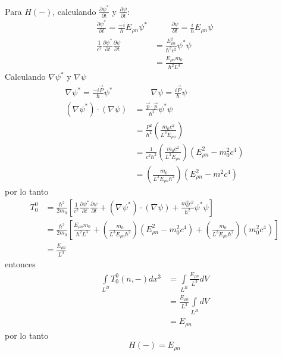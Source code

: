 Para $H(-)$, calculando $ \frac{\partial \psi^*}{\partial t}$  y $ \frac{\partial \psi}{\partial t}$:
\begin{align*}
    \frac{\partial \psi^*}{\partial t} = \frac{-i}{\hbar} E_{\rho n} \psi^* &\qquad  \frac{\partial \psi}{\partial t} = \frac{i}{\hbar} E_{\rho n} \psi\\
    \frac{1}{c^2}  \frac{\partial \psi^*}{\partial t} \frac{\partial \psi}{\partial t} &= \frac{E_{\rho n}^2}{\hbar^2c^2} \psi^* \psi\\
    &= \frac{E_{\rho n}m_0}{\hbar^2 L^3}
\end{align*}
Calculando $\nabla \psi^*$ y $\nabla \psi$
\begin{align*}
    \nabla \psi^* = \frac{-i\vec{P}}{\hbar}\psi^* &\qquad \nabla \psi = \frac{i\vec{P}}{\hbar} \psi\\
    \left(\nabla \psi^*\right) \cdot \left(\nabla \psi\right) &=\frac{\vec{p}\cdot \vec{p}}{\hbar^2} \psi^* \psi \\
    &= \frac{P^2}{\hbar^2} \left(\frac{m_0c^2}{L^3 E_{\rho n}}\right)\\
    &= \frac{1}{c^2 \hbar^2} \left(\frac{m_0c^2}{L^3 E_{\rho n}}\right) (E_{\rho n}^2-m_0^2c^4)\\
    &= \left(\frac{m_0}{L^3 E_{\rho n }\hbar^2}\right) (E_{\rho n}^2-m^2c^4)
\end{align*}
por lo tanto
\begin{align*}
    T_0^0 &= \frac{\hbar^2}{2m_0} \left[\frac{1}{c^2} \frac{\partial \psi^*}{\partial t}\frac{\partial \psi}{\partial t}+ \left(\nabla \psi^*\right)\cdot \left(\nabla \psi \right)+ \frac{m_0^2c^2}{\hbar^2} \psi^* \psi \right]  \\
    &= \frac{\hbar^2}{2m_0} \left[\frac{E_{\rho n}m_0}{\hbar^2 L^3} + \left(\frac{m_0}{L^3 E_{\rho n }\hbar^2}\right) (E_{\rho n}^2-m_0^2c^4)+\left(\frac{m_0}{L^3 E_{\rho n }\hbar^2}\right)(m_0^2c^4)\right]\\
    & = \frac{E_{\rho n}}{L^3}
\end{align*}
entonces
\begin{align*}
    \int\limits_{L^B}   T_0^0(n,-) dx^3 &= \int\limits_{L^B}  \frac{E_{\rho n}}{L^3} dV \\
    &= \frac{E_{\rho n}}{L^3} \int\limits_{L^B} dV \\
    &= E_{\rho n}
\end{align*}
por lo tanto
\begin{equation*}
    H(-)= E_{\rho n}
\end{equation*}